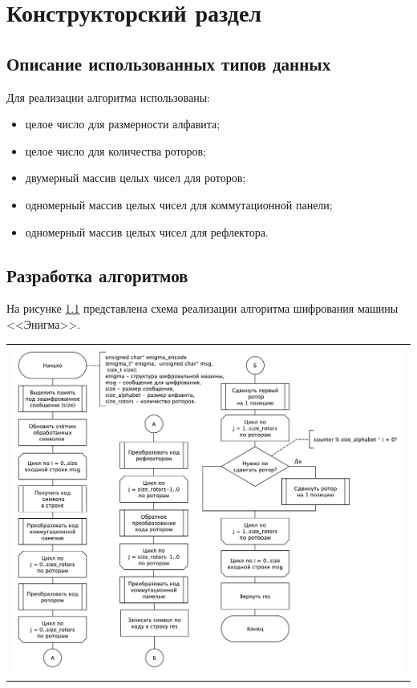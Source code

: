 \chapter{Конструкторский раздел}

\section{Описание использованных типов данных}

Для реализации алгоритма использованы:

\begin{itemize}[label=---]
	\item целое число для размерности алфавита;
	\item целое число для количества роторов;
	\item двумерный массив целых чисел для роторов;
	\item одномерный массив целых чисел для коммутационной панели;
	\item одномерный массив целых чисел для рефлектора.
\end{itemize}

\section{Разработка алгоритмов}

На рисунке \ref{img:enigma} представлена схема реализации алгоритма шифрования машины <<Энигма>>.

\begin{table}[H]
	\centering
	\begin{tabular}{p{1\linewidth}}
		\centering
		\includegraphics[width=1\linewidth]{inc/pdfs/encode.pdf}
		\captionof{figure}{Схема реализации алгоритма шифрования машины <<Энигма>>}
		\label{img:enigma}
	\end{tabular}
\end{table}
